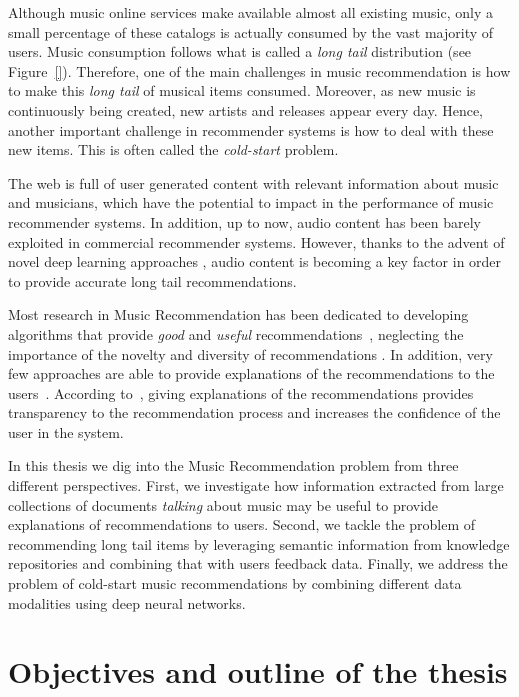 Although music online services make available almost all existing music, only a small percentage of these catalogs is actually consumed by the vast majority of users. Music consumption follows what is called a \textit{long tail} distribution \citep{oscarBook} (see Figure~\ref{}). Therefore, one of the main challenges in music recommendation is how to make this \textit{long tail} of musical items consumed. Moreover, as new music is continuously being created, new artists and releases appear every day. Hence, another important challenge in recommender systems is how to deal with these new items. This is often called the \textit{cold-start} problem. %

The web is full of user generated content with relevant information about music and musicians, which have the potential to impact in the performance of music recommender systems. In addition, up to now, audio content has been barely exploited in commercial recommender systems. However, thanks to the advent of novel deep learning approaches \citep{Oord2013}, audio content is becoming a key factor in order to provide accurate long tail recommendations.

Most research in Music Recommendation has been dedicated to developing algorithms that provide \textit{good} and \textit{useful} recommendations~\citep{oscarBook}, neglecting the importance of the novelty and diversity of recommendations \citep{adomavicius2012improving,Bellogin2010}. In addition, very few approaches are able to provide explanations of the recommendations to the users~\citep{Passant2008, Passant2010}. According to~\cite{celma2008new}, giving explanations of the recommendations provides transparency to the recommendation process and increases the confidence of the user in the system.

In this thesis we dig into the Music Recommendation problem from three different perspectives. First, we investigate how information extracted from large collections of documents \textit{talking} about music may be useful to provide explanations of recommendations to users. Second, we tackle the problem of recommending long tail items by leveraging semantic information from knowledge repositories and combining that with users feedback data. Finally, we address the problem of cold-start music recommendations by combining different data modalities using deep neural networks.


\section{Objectives and outline of the thesis}
\label{sec:intro:objectives}

